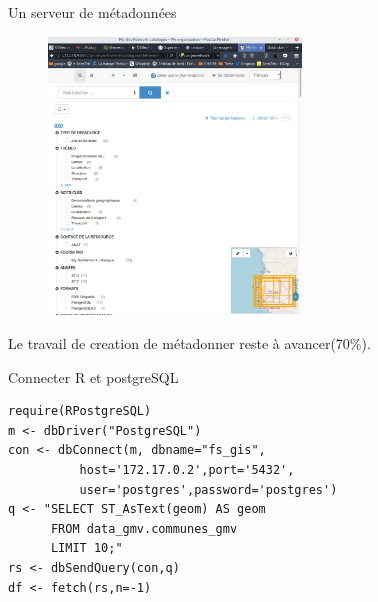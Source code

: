 \documentclass[newPxFont]{beamer}
\begin{document}
\begin{frame}[c]{Un serveur de métadonnées}
\vspace{-2em}
\begin{figure}
	\centering
	\includegraphics[width = 0.6\textwidth]{img/geonetwork}
\end{figure}
Le travail de creation de métadonner reste à avancer(70\%).
\end{frame}

\begin{frame}[fragile]{Connecter R et postgreSQL}
\vspace{-2em}
\begin{verbatim}
require(RPostgreSQL)
m <- dbDriver("PostgreSQL")
con <- dbConnect(m, dbname="fs_gis",
          host='172.17.0.2',port='5432',
          user='postgres',password='postgres')
q <- "SELECT ST_AsText(geom) AS geom
      FROM data_gmv.communes_gmv
      LIMIT 10;"
rs <- dbSendQuery(con,q)
df <- fetch(rs,n=-1)
\end{verbatim}
\end{frame}
\end{document}
